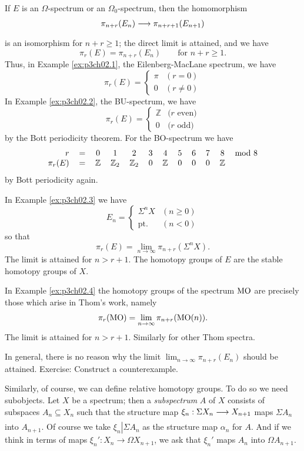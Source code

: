 \documentclass[../main]{subfiles}
\begin{document}
If $E$ is an $\Omega$-spectrum or an $\Omega_0$-spectrum, then the homomorphism
\[
\pi_{n+r}(E_n)
\lar{}
\pi_{n+r+1}(E_{n+1})
\]
is an isomorphism for $n+r\geq 1$; the direct limit is attained, and we have
\[
\pi_r(E)=\pi_{n+r}(E_n)
\qquad
\text{for $n+r\geq 1$.}
\]
Thus, in Example \ref{ex:p3ch02.1}, the Eilenberg-MacLane spectrum, we have
\[
\pi_r(E)
=
\begin{cases}
\pi &(r=0) \\
  0 &(r\neq 0)
\end{cases}
\]
In Example \ref{ex:p3ch02.2}, the BU-spectrum, we have
\[
\pi_r(E)
=
\begin{cases}
\mathbb Z &\text{($r$ even)} \\
  0 &\text{($r$ odd)}
\end{cases}
\]
by the Bott periodicity theorem. For the BO-spectrum we have
\[
\begin{tabular}{rccccccccccc}
$r$ & = & 
0&1&2&3&4&5&6&7&8&mod 8 \\
$\pi_r(E)$ & = &
$\mathbb Z$ & $\mathbb Z_2$ & $\mathbb Z_2$ & 0 & $\mathbb Z$ & 0 & 0 & 0 & $\mathbb Z$ &
\end{tabular}
\]
by Bott periodicity again.

In Example \ref{ex:p3ch02.3} we have
\[
E_n
=
\begin{cases}
\Sigma  ^nX         &(n\geq 0) \\
\mathrm{pt.} &(n<0)
\end{cases}
\]
so that
\[
\pi_r(E) = \lim_{n\to \infty} \pi_{n+r}(\Sigma  ^nX).
\]
The limit is attained for $n>r+1$. The homotopy groups of $E$ are the stable homotopy groups of $X$.

In Example \ref{ex:p3ch02.4} the homotopy groups of the spectrum $\mathrm{MO}$ are precisely those which arise in Thom's work, namely
\[
\pi_r(\mathrm{MO}) = \lim_{n\to \infty} \pi_{n+r}(\mathrm{MO}(n)).
\]
The limit is attained for $n>r+1$. Similarly for other Thom spectra.

In general, there is no reason why the limit $\displaystyle \lim_{n\to \infty} \pi_{n+r}(E_n)$ should be attained. Exercise: Construct a counterexample.

Similarly, of course, we can define relative homotopy groups. To do so we need subobjects. Let $X$ be a spectrum; then a \emph{subspectrum} $A$ of $X$ consists of subspaces $A_n\subseteq X_n$ such that the structure map $\xi_n: \Sigma   X_n \lar{} X_{n+1}$ maps $\Sigma   A_n$ into $A_{n+1}$. Of course we take $\left. \xi_n \right\rvert \Sigma   A_n$ as the structure map $\alpha_n$ for $A$. And if we think in terms of maps $\xi_n': X_n\to\Omega X_{n+1}$, we ask that $\xi_n'$ maps $A_n$ into $\Omega A_{n+1}$.
\end{document}
